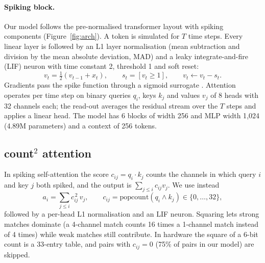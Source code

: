 \documentclass[10pt]{article}
\newcommand{\csq}{count$^2$}
\begin{document}
\paragraph{Spiking block.} Our model follows the pre-normalised transformer layout with spiking components
(Figure~\ref{fig:arch}). A token is simulated for $T$ time steps. Every linear layer is followed by an L1 layer
normalisation (mean subtraction and division by the mean absolute deviation, MAD) and a leaky integrate-and-fire
(LIF) neuron with time constant 2, threshold 1 and soft reset:
\begin{equation}
  v_t = \tfrac{1}{2}(v_{t-1} + x_t), \qquad s_t = [v_t \ge 1], \qquad v_t \leftarrow v_t - s_t .
  \label{eq:lif}
\end{equation}
Gradients pass the spike function through a sigmoid surrogate \citep{neftci2019surrogate}. Attention operates
per time step on binary queries $q_i$, keys $k_j$ and values $v_j$ of 8 heads with 32 channels each; the read-out
averages the residual stream over the $T$ steps and applies a linear head. The model has 6 blocks of width 256
and MLP width 1{,}024 (4.89M parameters) and a context of 256 tokens.

\subsection{\csq{} attention}
\label{sec:csq}

In spiking self-attention \citep{zhou2023spikformer} the score $c_{ij} = q_i \cdot k_j$ counts the channels in
which query $i$ and key $j$ both spiked, and the output is $\sum_{j \le i} c_{ij} v_j$. We use instead
\begin{equation}
  a_i = \sum_{j \le i} c_{ij}^{\,2}\, v_j , \qquad c_{ij} = \mathrm{popcount}(q_i \wedge k_j) \in \{0, \dots, 32\},
\end{equation}
followed by a per-head L1 normalisation and an LIF neuron. Squaring lets strong matches dominate (a 4-channel match
counts 16 times a 1-channel match instead of 4 times) while weak matches still contribute. In hardware the square
of a 6-bit count is a 33-entry table, and pairs with $c_{ij}=0$ (75\% of pairs in our model) are skipped.
\end{document}
